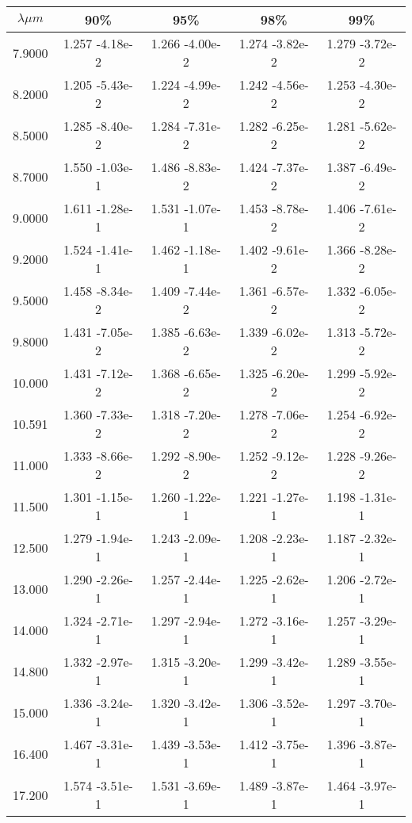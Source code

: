 \documentclass[12pt]{article}
\begin{document}
\begin{center}
\begin{table}
\begin{tabular}{| c | c | c | c | c |  }
\hline
 $\lambda \mu m$   & 90\%  & 95\%  & 98\%  & 99\% \\
\hline
7.9000  &   1.257 -4.18e-2  &  1.266 -4.00e-2   & 1.274 -3.82e-2  &  1.279 -3.72e-2 \\
8.2000  &    1.205 -5.43e-2 &   1.224 -4.99e-2  &  1.242 -4.56e-2  &  1.253 -4.30e-2 \\
8.5000  &   1.285 -8.40e-2  &  1.284 -7.31e-2  &  1.282 -6.25e-2  &  1.281 -5.62e-2 \\
8.7000  &  1.550 -1.03e-1  &  1.486 -8.83e-2  &  1.424 -7.37e-2  &  1.387 -6.49e-2 \\
9.0000   &   1.611 -1.28e-1  &  1.531 -1.07e-1 &   1.453 -8.78e-2  &  1.406 -7.61e-2 \\
9.2000   &   1.524 -1.41e-1  &  1.462 -1.18e-1  &  1.402 -9.61e-2  &  1.366 -8.28e-2 \\
9.5000   &   1.458 -8.34e-2 &   1.409 -7.44e-2 &   1.361 -6.57e-2  &  1.332 -6.05e-2 \\
9.8000   &   1.431 -7.05e-2 &   1.385 -6.63e-2  &  1.339 -6.02e-2  &  1.313 -5.72e-2 \\
10.000   &   1.431 -7.12e-2 &   1.368 -6.65e-2  &  1.325 -6.20e-2  &  1.299 -5.92e-2 \\
10.591   &   1.360 -7.33e-2 &   1.318 -7.20e-2  &  1.278 -7.06e-2 &  1.254 -6.92e-2 \\
11.000   &   1.333 -8.66e-2 &   1.292 -8.90e-2 &   1.252 -9.12e-2 &   1.228 -9.26e-2 \\
11.500   &   1.301 -1.15e-1  &  1.260 -1.22e-1 &   1.221 -1.27e-1 &   1.198 -1.31e-1 \\
12.500   &   1.279 -1.94e-1  &  1.243 -2.09e-1 &   1.208 -2.23e-1 &   1.187 -2.32e-1 \\
13.000   &   1.290 -2.26e-1  &  1.257 -2.44e-1  &  1.225 -2.62e-1 &   1.206 -2.72e-1 \\
14.000   &   1.324 -2.71e-1  &  1.297 -2.94e-1  &  1.272 -3.16e-1  &  1.257 -3.29e-1 \\
14.800   &   1.332 -2.97e-1  &  1.315 -3.20e-1 &   1.299 -3.42e-1 &   1.289 -3.55e-1 \\
15.000   &   1.336 -3.24e-1  &  1.320 -3.42e-1 &   1.306 -3.52e-1 &   1.297 -3.70e-1 \\
16.400   &   1.467 -3.31e-1  &  1.439 -3.53e-1 &   1.412 -3.75e-1 &   1.396 -3.87e-1 \\
17.200   &   1.574 -3.51e-1  &  1.531 -3.69e-1 &   1.489 -3.87e-1  &  1.464 -3.97e-1 \\

\end{tabular}
\end{table}
\end{center}
\end{document}
